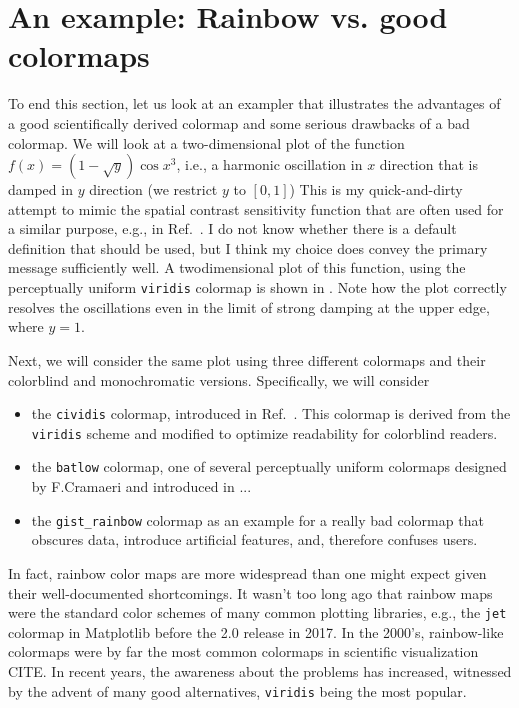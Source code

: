 \section{An example: Rainbow vs. good colormaps}\label{sec:rainbow}

To end this section, let us look at an exampler that illustrates the advantages of a good scientifically derived colormap and some serious drawbacks of a bad colormap. We will look at a two-dimensional plot of the function $f(x)= \left(1 - \sqrt{y} \right)  \cos x^3$, i.e., a harmonic oscillation in $x$ direction that is damped in $y$ direction (we restrict $y$ to $\left[0,1\right]$) This is my quick-and-dirty attempt to mimic the spatial contrast sensitivity function that are often used for a similar purpose, e.g., in Ref.~\cite{moreland2009}. I do not know whether there is a default definition that should be used, but I think my choice does convey the primary message sufficiently well.
A twodimensional plot of this function, using the perceptually uniform \verb|viridis| colormap is shown in . Note how the plot correctly resolves the oscillations even in the limit of strong damping at the upper edge, where $y=1$.

Next, we will consider the same plot using three different colormaps and their colorblind and monochromatic versions.
Specifically, we will consider
\begin{itemize}
\item the \verb|cividis| colormap, introduced in Ref.~\cite{cividis}. This colormap is derived from the \verb|viridis| scheme and modified to optimize readability for colorblind readers.
\item the \verb|batlow| colormap, one of several perceptually uniform colormaps designed by F.Cramaeri and introduced in ...
\item the \verb|gist_rainbow| colormap as an example for a really bad colormap that obscures data, introduce artificial features, and, therefore confuses users.
\end{itemize}

In fact, rainbow color maps are more widespread than one might expect given their well-documented shortcomings. 
It wasn't too long ago that rainbow maps were the standard color schemes of many common plotting libraries, e.g., the \verb|jet| colormap in Matplotlib before the 2.0 release in 2017.
In the 2000's, rainbow-like colormaps were by far the most common colormaps in scientific visualization CITE.
In recent years, the awareness about the problems has increased, witnessed by the advent of many good alternatives, \verb|viridis| being the most popular.




